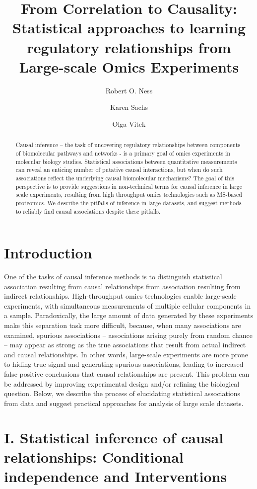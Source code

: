 \documentclass[journal=jacsat,manuscript=article]{achemso}
\author{Robert O. Ness}
\affiliation[Purdue University]{Department of Statistics, Purdue University, West Lafayette}
\author{Karen Sachs}
\affiliation[Stanford University]{School of Medicine, Stanford University, Palo Alto}
\author{Olga Vitek}
\affiliation[Northeastern University]{College of Science, College of Computer and Information Science, Northeastern University, Palo Alto}
\title[]
  {From Correlation to Causality: Statistical approaches to learning regulatory relationships from Large-scale Omics Experiments}
\begin{document}
\begin{abstract}
  Causal inference -- the task of uncovering regulatory relationships between components of biomolecular pathways and networks - is a primary goal of omics experiments in molecular biology studies.  Statistical associations between quantitative measurements can reveal an enticing number of putative causal interactions, but when do such associations reflect the underlying causal biomolecular mechanisms?  The goal of this perspective is to provide suggestions in non-technical terms for causal inference in large scale experiments, resulting from high throughput omics technologies such as MS-based proteomics.  We describe the pitfalls of inference in large datasets, and suggest methods to reliably find causal associations despite these pitfalls.
\end{abstract}

\section{Introduction}
One of the tasks of causal inference methods is to distinguish statistical association resulting from causal relationships from association resulting from indirect relationships. High-throughput omics technologies enable large-scale experiments, with simultaneous measurements of multiple cellular components in a sample. Paradoxically, the large amount of data generated by these experiments  make this separation task more difficult, because, when many associations are examined, spurious associations -- associations arising purely from random chance -- may appear as strong as the true associations that result from actual indirect and causal relationships. In other words, large-scale experiments are more prone to hiding true signal and generating spurious associations, leading to increased false positive conclusions that causal relationships are present. This problem can be addressed by improving experimental design and/or refining the biological question. Below, we describe the process of elucidating statistical associations from data and suggest practical approaches for analysis of large scale datasets.


\section{I. Statistical inference of causal relationships: Conditional independence and Interventions}
\end{document}
